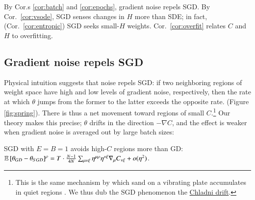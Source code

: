 
        By Cor.s \ref{cor:batch} and \ref{cor:epochs}, gradient noise repels SGD.
        By Cor.\ \ref{cor:vsode}, SGD senses changes in $H$ more than
            SDE; in fact, (Cor.\ \ref{cor:entropic}) SGD seeks small-$H$
            weights.
        Cor.\ \ref{cor:overfit} relates
            $C$ and $H$ to overfitting.

        \subsection{Gradient noise repels SGD}\label{subsect:epochs-batch}
            Physical intuition suggests that noise repels SGD: if two
            neighboring regions of weight space have high and low levels of
            gradient noise, respectively, then
            the rate at which
            $\theta$ jumps from the former to the latter
            exceeds%
            the opposite rate.
            (Figure \ref{fig:spring}{\!\!\protect{}}).
            There is thus a net movement toward regions of small $C$.\footnote{
                This is the same mechanism by which sand on a vibrating
                plate accumulates in quiet regions \citep{ch87}.  We thus dub
                the SGD phenomenon the
                \href{http://dataphys.org/list/chladni-plates/}{Chladni
                drift}.
            }
            Our theory makes this precise; $\theta$ drifts in the direction
            $-\nabla C$, and the effect is weaker when gradient noise is
            averaged out by large batch sizes:
            \begin{cor} \label{cor:batch}
                SGD with $E=B=1$ avoids high-$C$ regions more than GD:
                $
                    \mathbb{E}\left[\theta_{GD} - \theta_{SGD}\right]^\rho
                        =
                    T \cdot \frac{N-1}{4 N}
                    \sum_{\mu\nu\xi} \eta^{\mu\rho} \eta^{\nu\xi} \nabla_\mu C_{\nu\xi} + o(\eta^2)
                $.
            \end{cor}
